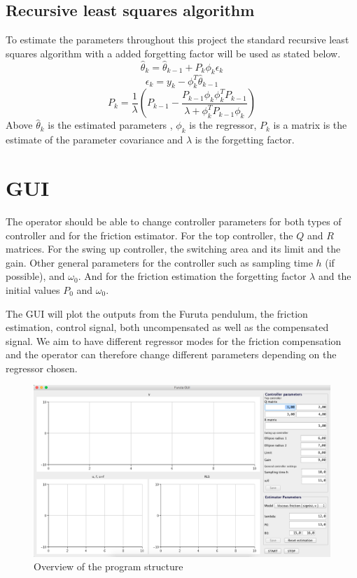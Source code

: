 \documentclass[10pt,a4paper]{article}
\begin{document}
\subsection{Recursive least squares algorithm}
\label{subsec:rlsalg}
To estimate the parameters throughout this project the standard recursive least squares algorithm with a added forgetting factor will be used as stated below. 
\begin{equation}
\hat{\theta}_k = \hat{\theta}_{k-1}+P_k\phi_k\epsilon_k 
\end{equation}
\begin{equation}
\epsilon_k=y_k-\phi_k^{T}\hat{\theta}_{k-1} 
\end{equation}
\begin{equation}
P_k=\frac{1}{\lambda}(P_{k-1}-\frac{P_{k-1}\phi_k\phi_k^{T}P_{k-1}}{\lambda+\phi_k^{T}P_{k-1}\phi_k})
\end{equation}
Above $\hat{\theta}_k$ is the estimated parameters , $\phi_k$ is the regressor, $P_k$ is a matrix is the estimate of the parameter covariance and $\lambda$ is the forgetting factor.

\section{GUI}
The operator should be able to change controller parameters for both types of controller and for the friction estimator. For the top controller, the $Q$ and $R$ matrices. For the swing up controller, the switching area and its limit and the gain. Other general parameters for the controller such as sampling time $h$ (if possible), and $\omega _0$. And for the friction estimation the forgetting factor $\lambda$ and the initial values $P_0$ and $\omega _0$.

The GUI will plot the outputs from the Furuta pendulum, the friction estimation, control signal, both uncompensated as well as the compensated signal. We aim to have different regressor modes for the friction compensation and the operator can therefore change different parameters depending on the regressor chosen. 

\begin{figure}[!htb]
\begin{center}
\includegraphics[width=1\textwidth]{gui.png}
\caption{Overview of the program structure}
\label{fig:gui}
\end{center}
\end{figure}
\end{document}
